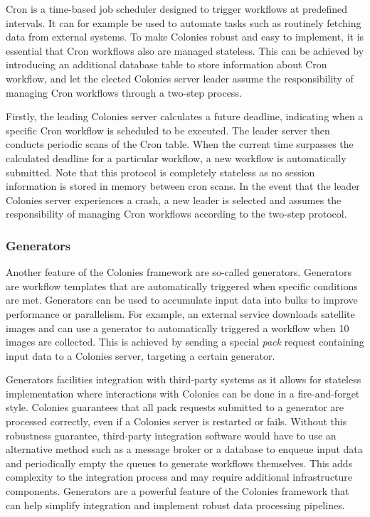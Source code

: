 \documentclass{article}
\begin{document}
Cron is a time-based job scheduler designed to trigger workflows at predefined intervals. It can for example be used to automate tasks such as routinely fetching data from external systems. To make Colonies robust and easy to implement, it is essential that Cron workflows also are managed stateless. This can be achieved by introducing an additional database table to store information about Cron workflow, and let the elected Colonies server leader assume the responsibility of managing Cron workflows through a two-step process. 

Firstly, the leading Colonies server calculates a future deadline, indicating when a specific Cron workflow is scheduled to be executed. The leader server then conducts periodic scans of the Cron table. When the current time surpasses the calculated deadline for a particular workflow, a new workflow is automatically submitted. Note that this protocol is completely stateless as no session information is stored in memory between cron scans. In the event that the leader Colonies server experiences a crash, a new leader is selected and assumes the responsibility of managing Cron workflows according to the two-step protocol.

\subsubsection{Generators}
Another feature of the Colonies framework are so-called generators. Generators are workflow templates that are automatically triggered when specific conditions are met. Generators can be used to accumulate input data into bulks to improve performance or parallelism. For example, an external service downloads satellite images and can use a generator to automatically triggered a workflow when 10 images are collected. This is achieved by sending a special \emph{pack} request containing input data to a Colonies server, targeting a certain generator. 

Generators facilities integration with third-party systems as it allows for stateless implementation where interactions with Colonies can be done in a fire-and-forget style. Colonies guarantees that all pack requests submitted to a generator are processed correctly, even if a Colonies server is restarted or fails. Without this robustness guarantee, third-party integration software would have to use an alternative method such as a message broker or a database to enqueue input data and periodically empty the queues to generate workflows themselves. This adds complexity to the integration process and may require additional infrastructure components. Generators are a powerful feature of the Colonies framework that can help simplify integration and implement robust data processing pipelines.
\end{document}
